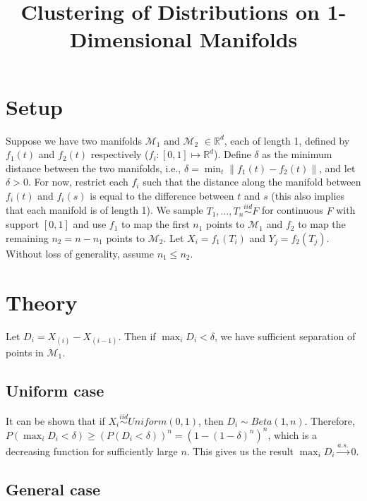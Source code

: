 \documentclass[
  11pt,
]{article}
\title{Clustering of Distributions on 1-Dimensional Manifolds}
\author{}
\date{\vspace{-2.5em}}
\begin{document}
\maketitle

\hypertarget{setup}{%
\section{Setup}\label{setup}}

Suppose we have two manifolds \(\mathcal{M}_1\) and \(\mathcal{M}_2\)
\(\in \mathbb{R}^d\), each of length 1, defined by \(f_1(t)\) and
\(f_2(t)\) respectively (\(f_i : [0, 1] \mapsto \mathbb{R}^d\)). Define
\(\delta\) as the minimum distance between the two manifolds, i.e.,
\(\delta = \min_t \|f_1(t) - f_2(t)\|\), and let \(\delta > 0\). For
now, restrict each \(f_i\) such that the distance along the manifold
between \(f_i(t)\) and \(f_i(s)\) is equal to the difference between
\(t\) and \(s\) (this also implies that each manifold is of length 1).
We sample \(T_1, ..., T_n \stackrel{iid}{\sim} F\) for continuous \(F\)
with support \([0, 1]\) and use \(f_1\) to map the first \(n_1\) points
to \(\mathcal{M}_1\) and \(f_2\) to map the remaining \(n_2 = n - n_1\)
points to \(\mathcal{M}_2\). Let \(X_i = f_1(T_i)\) and
\(Y_j = f_2(T_j)\). Without loss of generality, assume \(n_1 \leq n_2\).

\hypertarget{theory}{%
\section{Theory}\label{theory}}

Let \(D_i = X_{(i)} - X_{(i-1)}\). Then if \(\max_i D_i < \delta\), we
have sufficient separation of points in \(\mathcal{M}_1\).

\hypertarget{uniform-case}{%
\subsection{Uniform case}\label{uniform-case}}

It can be shown that if \(X_i \stackrel{iid}{\sim} Uniform(0, 1)\), then
\(D_i \sim Beta(1, n)\). Therefore,
\(P(\max_i D_i < \delta) \geq (P(D_i < \delta))^n = (1 - (1 - \delta)^n)^n\),
which is a decreasing function for sufficiently large \(n\). This gives
us the result \(\max_i D_i \stackrel{a.s.}{\to} 0\).

\hypertarget{general-case}{%
\subsection{General case}\label{general-case}}
\end{document}

